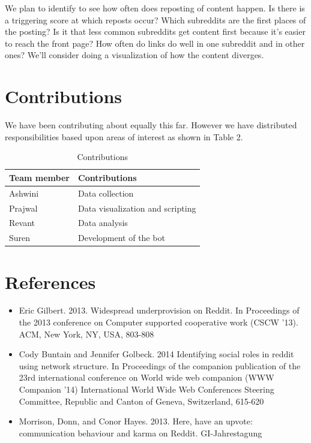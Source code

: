 \documentclass{article} %
\begin{document}
We plan to identify to see how often does reposting of content happen. Is there is a triggering score at which reposts occur? Which subreddits are the first places of the posting? Is it that less common subreddits get content first because it's easier to reach the front page? How often do links do well in one subreddit and in other ones? We'll consider doing a visualization of how the content diverges.


\section{Contributions}
We have been contributing about equally this far. However we have distributed responsibilities based upon areas of interest as shown in Table 2.


\begin{table}
\begin{center}
    \begin{tabular}{ | l | l | }
    \hline
    Team member & Contributions \\ \hline
    Ashwini & Data collection \\ \hline
    Prajwal & Data visualization and scripting \\ \hline
    Revant & Data analysis \\ \hline
    Suren & Development of the bot \\ 
    \hline
    \end{tabular}
    \caption{Contributions}
    \end{center}
    \end{table}



\section{References}
\begin{itemize}
\item Eric Gilbert. 2013. Widespread underprovision on Reddit. In Proceedings of the 2013 conference on Computer supported cooperative work (CSCW '13). ACM, New York, NY, USA, 803-808
\item Cody Buntain and Jennifer Golbeck. 2014 Identifying social roles in reddit using network structure. In Proceedings of the companion publication of the 23rd international conference on World wide web companion (WWW Companion '14) International World Wide Web Conferences Steering Committee, Republic and Canton of Geneva, Switzerland, 615-620
\item Morrison, Donn, and Conor Hayes. 2013. Here, have an upvote: communication behaviour and karma on Reddit. GI-Jahrestagung
\end{itemize}
\end{document}
